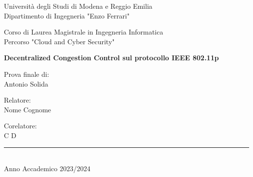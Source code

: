 \thispagestyle{plain}

\begin{titlepage}
    \begin{center}

		Università degli Studi di Modena e Reggio Emilia\\
		\large
		Dipartimento di Ingegneria "Enzo Ferrari"

        \vspace{2.5cm}
        
		\Large
		Corso di Laurea Magistrale in Ingegneria Informatica\\
		
		\large
		Percorso "Cloud and Cyber Security"		
		
		\vspace{2.5cm}
        
        \Huge
        \textbf{Decentralized Congestion Control sul protocollo IEEE 802.11p}

        \vspace{3cm}

		\large
		

		\begin{flushright}
		Prova finale di:\\
		Antonio Solida
		\end{flushright}		        
        
        
		\Large        
        \vspace{3cm}
        
        \begin{flushleft}
        Relatore:\\
        Nome Cognome
        \end{flushleft}
                
        \begin{flushleft}
        Corelatore:\\
        C D
        \end{flushleft}
            
		\vfill
		
		\rule{300pt}{0.2pt}\\
		\small
		Anno Accademico 2023/2024
            
    \end{center}
\end{titlepage}